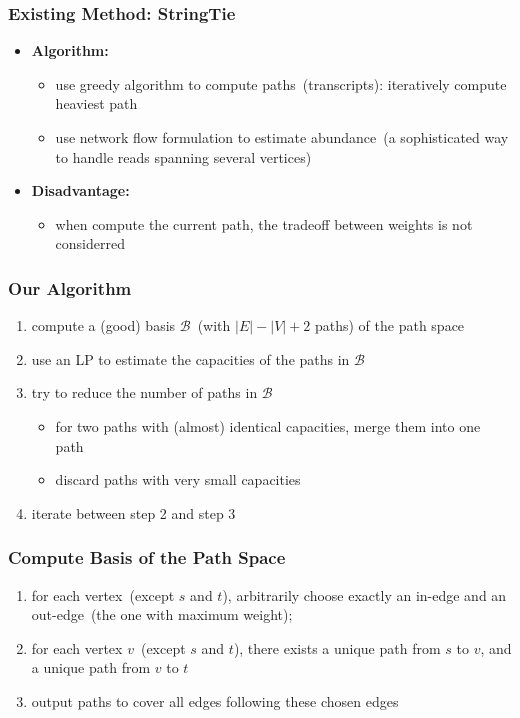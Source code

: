 \frame
{
	\frametitle{Existing Method: StringTie}
	\begin{itemize}
	\item {\bf Algorithm:} 
		\begin{itemize}
		\item use greedy algorithm to compute paths~(transcripts): iteratively
			compute heaviest path
		\item use network flow formulation to estimate abundance~(a sophisticated
				way to handle reads spanning several vertices)
		\end{itemize}
	\vspace{0.5cm}
	\item {\bf Disadvantage:} 
		\begin{itemize} 
		\item when compute the current path, the tradeoff between weights is
			not considerred
		\end{itemize}
	\end{itemize}
}

\frame
{
	\frametitle{Our Algorithm}
	\begin{enumerate}
	\item compute a (good) basis $\mathcal{B}$~(with $|E|-|V|+2$ paths) of the path space
	\vspace{0.2cm}
	\item use an LP to estimate the capacities of the paths in $\mathcal{B}$
	\vspace{0.2cm}
	\item try to reduce the number of paths in $\mathcal{B}$
		\begin{itemize}
		\vspace{0.1cm}
		\item for two paths with (almost) identical capacities, merge them into one path
		\vspace{0.1cm}
		\item discard paths with very small capacities
		\end{itemize}
	\vspace{0.2cm}
	\item iterate between step 2 and step 3
	\end{enumerate}
}

\frame
{
	\frametitle{Compute Basis of the Path Space}

	\begin{enumerate}
	\item for each vertex~(except $s$ and $t$), arbitrarily choose exactly an in-edge and an out-edge~(the one with maximum weight);
	\vspace{1.2cm}
	
	\vspace{1.5cm}
	\item for each vertex $v$~(except $s$ and $t$), there exists a unique path from $s$ to $v$, and a unique path from $v$ to $t$
	\vspace{0.2cm}
	\item output paths to cover all edges following these chosen edges 
	\end{enumerate}

}

